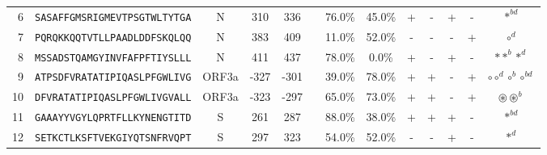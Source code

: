 \begin{tabular}{rcccccccccccc}
6  &  \texttt{SASAFFGMSRIGMEVTPSGTWLTYTGA} &       N &    310 &   336 &                &                          76.0\% &                           45.0\% &          + &           - &          + &           - &                                                                                                                            $ \ast^{bd} $ \\
7  &  \texttt{PQRQKKQQTVTLLPAADLDDFSKQLQQ} &       N &    383 &   409 &                &                          11.0\% &                           52.0\% &          - &           - &          - &           + &                                                                                                                              $ \circ^d $ \\
8  &  \texttt{MSSADSTQAMGYINVFAFPFTIYSLLL} &       N &    411 &   437 &                &                          78.0\% &                            0.0\% &          + &           - &          + &           - &                                                                                                                   $ \ast \ast^b \ast^d $ \\
9  &  \texttt{ATPSDFVRATATIPIQASLPFGWLIVG} &   ORF3a &   -327 &  -301 &                &                          39.0\% &                           78.0\% &          + &           + &          - &           + &                                                                                                     $ \circ \circ^d \circ^b \circ^{bd} $ \\
10 &  \texttt{DFVRATATIPIQASLPFGWLIVGVALL} &   ORF3a &   -323 &  -297 &                &                          65.0\% &                           73.0\% &          + &           + &          - &           + &                                                                                                            $ \circledast \circledast^b $ \\
11 &  \texttt{GAAAYYVGYLQPRTFLLKYNENGTITD} &       S &    261 &   287 &                &                          88.0\% &                           38.0\% &          + &           + &          + &           - &                                                                                                                            $ \ast^{bd} $ \\
12 &  \texttt{SETKCTLKSFTVEKGIYQTSNFRVQPT} &       S &    297 &   323 &                &                          54.0\% &                           52.0\% &          - &           - &          + &           - &                                                                                                                               $ \ast^d $ \\

\end{tabular}
